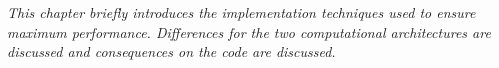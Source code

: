 
\label{cap:chapter_hpc}

\textit{This chapter briefly introduces the implementation techniques used to ensure maximum performance. Differences for the two computational architectures are discussed and consequences on the code are discussed.}



